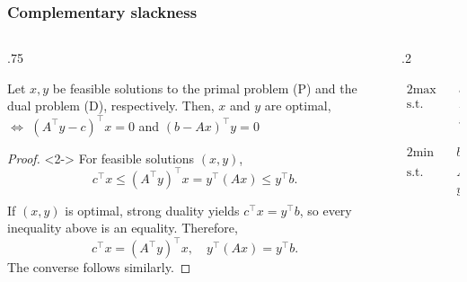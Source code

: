 \documentclass[14pt,aspectratio=169,xcolor=dvipsnames,table,onlytextwidth]{beamer}
\begin{document}
\begin{frame}
    \frametitle{Complementary slackness}

    \small
    \begin{columns}[T]
    \begin{column}{.75\textwidth}
    \begin{lemma}
        Let $x, y$ be feasible solutions to the primal problem (P) and the dual problem (D), respectively. 
        Then, $x$ and $y$ are optimal, \\ 
        $\iff$ 
            $(A^\top y - c)^\top x = 0$
            and 
            $(b - Ax)^\top y = 0$  
    \end{lemma}

    \begin{proof}<2->
    For feasible solutions $(x,y)$,
    \setlength{\abovedisplayskip}{4pt}
    \setlength{\belowdisplayskip}{4pt}
    \[
        c^\top x \leq (A^\top y)^\top x = y^\top (Ax) \leq y^\top b.
    \]
    
    \bigskip
    If $(x,y)$ is optimal, strong duality yields $c^\top x = y^\top b$, so every inequality above is an equality.
     Therefore,
    \[
        c^\top x = (A^\top y)^\top x, \quad y^\top (Ax) = y^\top b.
    \]
    The converse follows similarly.
    \end{proof}
    \end{column}
    \begin{column}{.2\textwidth}
    \footnotesize
    \begin{primal}
        \setlength{\abovedisplayskip}{0pt}
        \begin{alignat*}{2}
            \text{max} & \quad  c^\top x \\
            \text{s.t.} & \quad A x \leq b  \\
            & \quad x \geq 0 
        \end{alignat*}
    \end{primal}
    \begin{dual}
        \setlength{\abovedisplayskip}{0pt}
        \begin{alignat*}{2}
            \text{min} & \quad  b^\top y \\
            \text{s.t.} & \quad A^\top y \geq c  \\
            & \quad y \geq 0 
        \end{alignat*}
    \end{dual}
    \end{column}
    \end{columns}
\end{frame}
\end{document}
